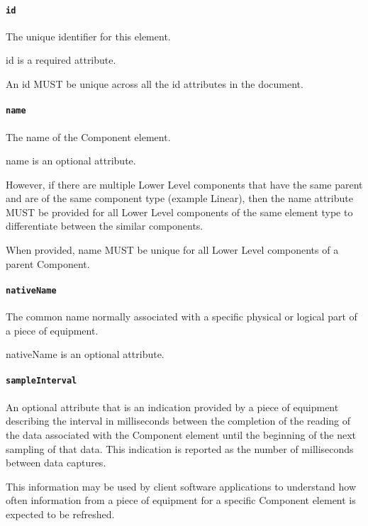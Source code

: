 \paragraph{\texttt{id}}\mbox{}
\newline\tab The unique identifier for this element.

id is a required attribute.

An id MUST be unique across all the id attributes in the document.


\paragraph{\texttt{name}}\mbox{}
\newline\tab The name of the Component element.

name is an optional attribute.

However, if there are multiple Lower Level components that have the same parent and are of the same component type (example Linear), then the name attribute MUST be provided for all Lower Level components of the same element type to differentiate between the similar components.

When provided, name MUST be unique for all Lower Level components of a parent Component.



\paragraph{\texttt{nativeName}}\mbox{}
\newline\tab The common name normally associated with a specific physical or logical part of a piece of equipment.

nativeName is an optional attribute.

\paragraph{\texttt{sampleInterval}}\mbox{}
\newline\tab An optional attribute that is an indication provided by a piece of equipment describing the interval in milliseconds between the completion of the reading of the data associated with the Component element until the beginning of the
next sampling of that data. This indication is reported as the number of milliseconds between data captures.

This information may be used by client software applications to understand how often information from a piece of equipment for a specific Component element is expected to be refreshed.

